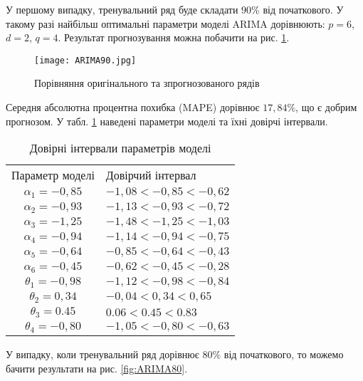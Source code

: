 У першому випадку, тренувальний ряд буде складати $90\%$ від початкового. У такому разі найбільш оптимальні параметри моделі ARIMA дорівнюють: $p = 6$, $d = 2$, $q = 4$. Результат прогнозування можна побачити на рис. \ref{fig:ARIMA90}.

\vspace{1em}

\begin{figure}[h]
  \texttt{[image: ARIMA90.jpg]}
  \caption{Порівняння оригінального та зпрогнозованого рядів}
  \label{fig:ARIMA90}
\end{figure}


Середня абсолютна процентна похибка (MAPE) дорівнює $17,84\%$, що є добрим прогнозом. У табл. \ref{tab:ARIMA90} наведені параметри моделі та їхні довірчі інтервали.

\begin{table}[h]
\caption{Довірні інтервали параметрів моделі}\label{tab:ARIMA90}
\begin{tabular}{|c|m{}|}
\hline
Параметр моделі & Довірчий інтервал \\
		\hlinewd{2pt}
$\alpha_{1} = -0,85$ & $-1,08 < -0,85 < -0,62$ \\
\hline
$\alpha_{2} = -0,93$ & $-1,13 < -0,93 < -0,72$ \\
\hline
$\alpha_{3} = -1,25$ & $-1,48 < -1,25 < -1,03$ \\
\hline
$\alpha_{4} = -0,94$ & $-1,14 < -0,94 < -0,75$ \\
\hline
$\alpha_{5} = -0,64$ & $-0,85 < -0,64 < -0,43$ \\
\hline
$\alpha_{6} = -0,45$ & $-0,62 < -0,45 < -0,28$ \\
\hline
$\theta_{1} = -0,98$ & $-1,12 < -0,98 < -0,84$ \\
\hline
$\theta_{2} = 0,34$ & $-0,04 < 0,34 < 0,65$ \\
\hline
$\theta_{3} = 0.45$ & $0.06 < 0.45 < 0.83$ \\
\hline
$\theta_{4} = -0,80$ & $-1,05 < -0,80 < -0,63$ \\
\hline
\end{tabular}
\end{table}

У випадку, коли тренувальний ряд дорівнює $80\%$ від початкового, то можемо бачити результати на рис. \ref{fig:ARIMA80}.

